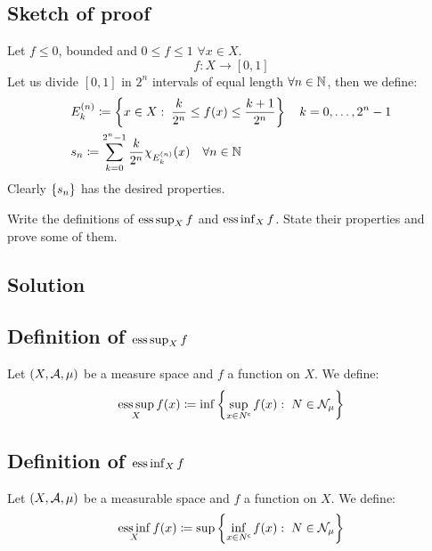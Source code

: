 \subsection*{Sketch of proof}
Let $f\leq0$, bounded and $0 \leq f \leq 1$ $\forall x\in X$.
\[
    f : X \to [0,1] 
\]
Let us divide $[0,1]$ in $2^n$ intervals of equal length $\forall n \in \mathbb{N}$, then we define:
\begin{align*}
    & E_k^{(n)} \coloneqq \left\{ x\in X: \; \frac{k}{2^n} \leq f(x) \leq \frac{k+1}{2^n} \right\} \quad k = 0,\dots,2^n-1 \\
    & s_n \coloneqq \sum_{k=0}^{2^n-1} \frac{k}{2^n} \chi_{E_k^{(n)}}(x) \quad \forall n\in\mathbb{N}
\end{align*}
Clearly $\{ s_n \}$ has the desired properties.


\question

Write the definitions of $\operatorname*{ess\,sup}_X f$ and $\operatorname*{ess\,inf}_X f$. State their properties and prove some of them.

\subsection*{Solution}

\subsection{Definition of \texorpdfstring{$\operatorname*{ess\,sup}_X f$}{essup f}}
Let $(X, \mathcal{A}, \mu)$ be a measure space and $f$ a function on $X$. We define:
\[
    \operatorname*{ess\,sup}_X f(x) \coloneqq \inf \left\{ \sup_{x\in N^{\mathsf{c}}} f(x) : \; N \in \mathcal{N}_{\mu} \right\}
\]

\subsection{Definition of \texorpdfstring{$\operatorname*{ess\,inf}_X f$}{essinf f}}
Let $(X, \mathcal{A}, \mu)$ be a measurable space and $f$ a function on $X$. We define:
\[
    \operatorname*{ess\,inf}_X f(x) \coloneqq \sup \left\{ \inf_{x\in N^{\mathsf{c}}} f(x) : \; N \in \mathcal{N}_{\mu} \right\}
\]

